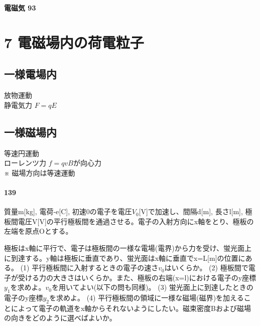 \documentclass[a4paper, 10pt, dvipdfmx]{bxjsarticle}
\begin{document}
\bigskip

\noindent
\textbf{電磁気 93}

\section*{7 電磁場内の荷電粒子}

\subsection*{一様電場内}
放物運動 \\
静電気力 $F=qE$
\begin{center}
\end{center}

\subsection*{一様磁場内}
等速円運動 \\
ローレンツ力 $f=qvB$が向心力 \\
※ 磁場方向は等速運動
\begin{center}
\end{center}

\paragraph{139} 質量m[kg], 電荷-e[C], 初速0の電子を電圧$V_0$[V]で加速し、間隔d[m], 長さl[m], 極板間電圧V[V]の平行極板間を通過させる。電子の入射方向にx軸をとり、極板の左端を原点Oとする。
\begin{center}
\end{center}
極板はx軸に平行で、電子は極板間の一様な電場(電界)から力を受け、蛍光面上に到達する。y軸は極板に垂直であり、蛍光面はx軸に垂直でx=L[m]の位置にある。
(1) 平行極板間に入射するときの電子の速さ$v_0$はいくらか。
(2) 極板間で電子が受ける力の大きさはいくらか。また、極板の右端(x=l)における電子のy座標$y_1$を求めよ。$v_0$を用いてよい(以下の問も同様)。
(3) 蛍光面上に到達したときの電子のy座標$y_2$を求めよ。
(4) 平行極板間の領域に一様な磁場(磁界)を加えることによって電子の軌道をx軸からそれないようにしたい。磁束密度Bおよび磁場の向きをどのように選べばよいか。

\clearpage

\end{document}
